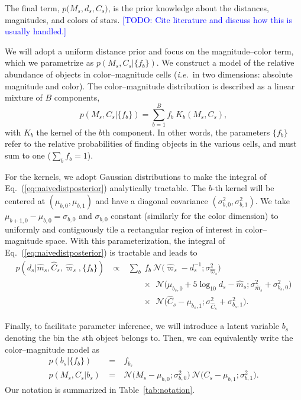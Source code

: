 \documentclass[manuscript, letterpaper]{aastex6}
\newcommand{\ie}{{\textit{i.e.}~}}
\newcommand{\equref}[1]{{\xspace}Eq.~(\ref{#1})}
\newcommand{\equ}[1]{\begin{equation}#1\end{equation}}
\newcommand{\eqn}[1]{\begin{eqnarray}#1\end{eqnarray}}
\newcommand{\todo}[1]{\textcolor{blue}{[TODO: #1]}}
\begin{document}
The final term, $ p\bigl( M_s, d_s, C_s \bigr) $, is the prior knowledge about the distances, magnitudes, and colors of stars. 
\todo{Cite literature and discuss how this is usually handled.}

We will adopt a uniform distance prior and focus on the magnitude--color term, which we parametrize as $p\left(M_s, C_s  \bigr\rvert \{ f_{b} \} \right) $.
We construct a model of the relative abundance of objects in color--magnitude cells (\ie in two dimensions: absolute magnitude and color).
The color--magnitude distribution is described as a linear mixture of $B$ components,
\equ{
	p\left(M_s, C_s  \bigr\rvert \{ f_{b} \} \right) = \sum_{b=1}^B f_b \ K_b(M_s, C_s),
} 
with $K_b$ the kernel of the $b$th component. 
In other words, the parameters $\{ f_{b} \}$ refer to the relative probabilities of finding objects in the various cells, and must sum to one ($\sum_b f_b = 1$).

For the kernels, we adopt Gaussian distributions to make the integral of \equref{eq:naivedistposterior} analytically tractable.
The $b$-th kernel will be centered at $(\mu_{b,0}, \mu_{b,1})$ and have a diagonal covariance $(\sigma_{b,0}^2, \sigma_{b,1}^2)$.
We take $\mu_{b+1,0}-\mu_{b,0} = \sigma_{b,0}$ and $\sigma_{b,0}$ constant (similarly for the color dimension) to uniformly and contiguously tile a rectangular region of interest in color--magnitude space. 
With this parameterization, the integral of \equref{eq:naivedistposterior} is tractable and leads to
\eqn{
	p(d_s | \hat{m}_s, \hat{C}_s, \hat{\varpi}_s, \{ f_{b} \})  \ &\propto&  \ \sum_b\ f_b \ \mathcal{N}\bigl(\hat{\varpi}_s - d_s^{-1};\sigma_{\hat{\varpi}_s}^2 \bigr) \\ 
	&& \quad\quad \times \ \ \mathcal{N}\bigl( \mu_{b_s,0} + 5\log_{10}d_s  -\hat{m}_s ;\sigma_{\hat{m}_s}^2 + \sigma_{b_s,0}^2 \bigr) \nonumber\\ 
	&& \quad\quad \times \ \ \mathcal{N}\bigl(\hat{C}_s - \mu_{b_s,1};\sigma_{\hat{C}_s}^2 + \sigma_{b_s,1}^2 \bigr). \label{eq:distposterior}\nonumber
}

Finally, to facilitate parameter inference, we will introduce a latent variable $b_s$ denoting the bin the $s$th object belongs to.
Then, we can equivalently write the color--magnitude model as
\eqn{
	p\left(b_s \bigr\rvert \bigl\{ f_b \bigr\}\right) \ &=& \ f_{b_s} \\ 
	p\left(M_s, C_s \bigr\rvert b_s \right) \ &=& \ \mathcal{N}\bigl(M_s - \mu_{b,0};\sigma_{b,0}^2 \bigr)  \ \mathcal{N}\bigl(C_s - \mu_{b,1};\sigma_{b,1}^2 \bigr).\nonumber
}
Our notation is summarized in Table~\ref{tab:notation}.
\end{document}

